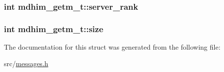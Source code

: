 \hypertarget{structmdhim__getm__t_a2fe10e46b27b008657d3c59299ea1fd6}{
\subsubsection[{server\-\_\-rank}]{\setlength{\rightskip}{0pt plus 5cm}int mdhim\-\_\-getm\-\_\-t\-::server\-\_\-rank}}\label{structmdhim__getm__t_a2fe10e46b27b008657d3c59299ea1fd6}
\hypertarget{structmdhim__getm__t_aa6649f87300a3899693521850fa28a17}{
\subsubsection[{size}]{\setlength{\rightskip}{0pt plus 5cm}int mdhim\-\_\-getm\-\_\-t\-::size}}\label{structmdhim__getm__t_aa6649f87300a3899693521850fa28a17}


The documentation for this struct was generated from the following file\-:\begin{DoxyCompactItemize}
\item 
src/\hyperlink{messages_8h}{messages.\-h}\end{DoxyCompactItemize}
